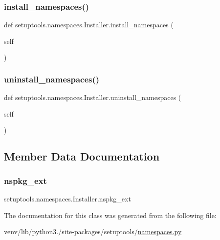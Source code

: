 \subsubsection{\texorpdfstring{install\+\_\+namespaces()}{install\_namespaces()}}
{\footnotesize\ttfamily def setuptools.\+namespaces.\+Installer.\+install\+\_\+namespaces (\begin{DoxyParamCaption}\item[{}]{self }\end{DoxyParamCaption})}

\mbox{\label{classsetuptools_1_1namespaces_1_1Installer_a82bca6421a59db161d2f78b6ba075092}} 
\subsubsection{\texorpdfstring{uninstall\+\_\+namespaces()}{uninstall\_namespaces()}}
{\footnotesize\ttfamily def setuptools.\+namespaces.\+Installer.\+uninstall\+\_\+namespaces (\begin{DoxyParamCaption}\item[{}]{self }\end{DoxyParamCaption})}



\subsection{Member Data Documentation}
\mbox{\label{classsetuptools_1_1namespaces_1_1Installer_a819c039a70ac64b39985e5cf6561fd97}} 
\subsubsection{\texorpdfstring{nspkg\+\_\+ext}{nspkg\_ext}}
{\footnotesize\ttfamily setuptools.\+namespaces.\+Installer.\+nspkg\+\_\+ext\hspace{0.3cm}{\ttfamily [static]}}



The documentation for this class was generated from the following file\+:\begin{DoxyCompactItemize}
\item 
venv/lib/python3./site-\/packages/setuptools/\hyperlink{namespaces_8py}{namespaces.\+py}\end{DoxyCompactItemize}
